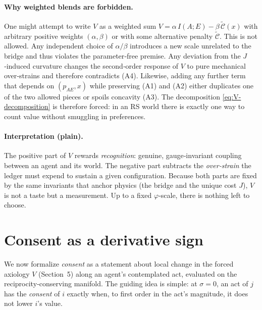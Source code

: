 \documentclass[11pt]{article}
\begin{document}
\paragraph{Why weighted blends are forbidden.}
One might attempt to write $V$ as a weighted sum $V=\alpha\, I(A;E)-\beta\,\widetilde{\mathcal{C}}(x)$ with arbitrary positive weights $(\alpha,\beta)$ or with some alternative penalty $\widetilde{\mathcal{C}}$. This is not allowed. Any independent choice of $\alpha/\beta$ introduces a new scale unrelated to the bridge and thus violates the parameter‑free premise. Any deviation from the $J$‑induced curvature changes the second‑order response of $V$ to pure mechanical over‑strains and therefore contradicts (A4). Likewise, adding any further term that depends on $(p_{AE},x)$ while preserving (A1) and (A2) either duplicates one of the two allowed pieces or spoils concavity (A3). The decomposition \eqref{eq:V-decomposition} is therefore forced: in an RS world there is exactly one way to count value without smuggling in preferences.

\paragraph{Interpretation (plain).}
The positive part of $V$ rewards \emph{recognition}: genuine, gauge‑invariant coupling between an agent and its world. The negative part subtracts the \emph{over‑strain} the ledger must expend to sustain a given configuration. Because both parts are fixed by the same invariants that anchor physics (the bridge and the unique cost $J$), $V$ is not a taste but a measurement. Up to a fixed $\varphi$‑scale, there is nothing left to choose.

\section{Consent as a derivative sign}

We now formalize \emph{consent} as a statement about local change in the forced axiology $V$ (Section~5) along an agent’s contemplated act, evaluated on the reciprocity‑conserving manifold. The guiding idea is simple: at $\sigma\!=\!0$, an act of $j$ has the \emph{consent} of $i$ exactly when, to first order in the act’s magnitude, it does not lower $i$’s value.
\end{document}
